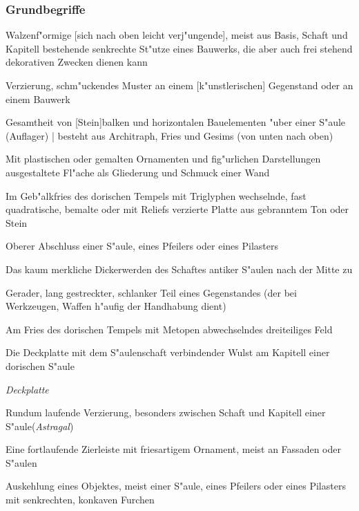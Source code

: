 \documentclass[emulatestandardclasses]{scrartcl}
\begin{document}
\subsubsection{Grundbegriffe}

\begin{description}[leftmargin=!,labelwidth=\widthof{\bfseries Perlenstab}]
  \item[S"aule] Walzenf"ormige [sich nach oben leicht verj"ungende], meist aus Basis, Schaft und Kapitell bestehende senkrechte St"utze eines Bauwerks, die aber auch frei stehend dekorativen Zwecken dienen kann
  \item[Ornament] Verzierung, schm"uckendes Muster an einem [k"unstlerischen] Gegenstand oder an einem Bauwerk
  \item[Geb"alk] Gesamtheit von [Stein]balken und horizontalen Bauelementen "uber einer S"aule (Auflager) | besteht aus Architraph, Fries und Gesims (von unten nach oben)
  \item[Fries] Mit plastischen oder gemalten Ornamenten und fig"urlichen Darstellungen ausgestaltete Fl"ache als Gliederung und Schmuck einer Wand
  \item[Metope] Im Geb"alkfries des dorischen Tempels mit Triglyphen wechselnde, fast quadratische, bemalte oder mit Reliefs verzierte Platte aus gebranntem Ton oder Stein
  \item[Kapitell] Oberer Abschluss einer S"aule, eines Pfeilers oder eines Pilasters
  \item[Entasis] Das kaum merkliche Dickerwerden des Schaftes antiker S"aulen nach der Mitte zu
  \item[Schaft] Gerader, lang gestreckter, schlanker Teil eines Gegenstandes (der bei Werkzeugen, Waffen h"aufig der Handhabung dient)
  \item[Triglyph] Am Fries des dorischen Tempels mit Metopen abwechselndes dreiteiliges Feld
  \item[Echinus] Die Deckplatte mit dem S"aulenschaft verbindender Wulst am Kapitell einer dorischen S"aule
  \item[Abakus] \emph{Deckplatte}
  \item[Perlenstab] Rundum laufende Verzierung, besonders zwischen Schaft und Kapitell einer S"aule(\emph{Astragal})
  \item[Eierstab] Eine fortlaufende Zierleiste mit friesartigem Ornament, meist an Fassaden oder S"aulen
  \item[Kannelur] Auskehlung eines Objektes, meist einer S"aule, eines Pfeilers oder eines Pilasters mit senkrechten, konkaven Furchen
\end{description}
\end{document}
